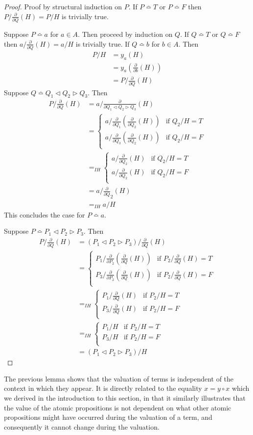 \documentclass[a4paper,twoside,openright]{report}
\newcommand{\dd}[1]{\frac{\partial}{\partial #1}}
\newcommand{\syn}{\bumpeq}
\newcommand{\lef}{\ensuremath{\triangleleft}}
\newcommand{\rig}{\ensuremath{\triangleright}}
\begin{document}
\begin{proof}
Proof by structural induction on $P$. If $P\syn T$ or $P\syn F$ then $P/\dd Q(H) = P/H$ is trivially true. 

Suppose $P\syn a$ for $a\in A$. Then proceed by induction on $Q$. If $Q\syn T$ or $Q\syn F$ then $a/\dd Q(H) = a/H$ is trivially true. If $Q\syn b$ for $b\in A$. Then
\begin{align*}
P/H &= y_a(H)\\
&= y_a(\dd b(H))\\
&= P/\dd Q(H)
\end{align*}
Suppose $Q\syn Q_1\lef Q_2\rig Q_3$. Then
\begin{align*}
P/\dd Q(H)
&=a/\dd{Q_1\lef Q_2\rig Q_3}(H)\\
&=\begin{cases}
a/\dd {Q_1}(\dd {Q_2}(H)) & \text{if $Q_2/H=T$}\\
a/\dd {Q_3}(\dd {Q_2}(H)) & \text{if $Q_2/H=F$}\\
\end{cases}\\
&=_{IH}\begin{cases}
a/\dd {Q_2}(H) & \text{if $Q_2/H=T$}\\
a/\dd {Q_2}(H) & \text{if $Q_2/H=F$}\\
\end{cases}\\
&=a/\dd Q_2(H)\\
&=_{IH}a/H
\end{align*}
This concludes the case for $P\syn a$.

Suppose $P\syn P_1\lef P_2\rig P_3$. Then
\begin{align*}
P/\dd Q(H)
&=(P_1\lef P_2\rig P_3)/\dd Q(H)\\
&=\begin{cases}
P_1/\dd {P_2}(\dd Q(H)) & \text{if $P_2/\dd Q(H)=T$}\\
P_3/\dd {P_2}(\dd Q(H)) & \text{if $P_2/\dd Q(H)=F$}\\
\end{cases}\\
&=_{IH}\begin{cases}
P_1/\dd Q(H) & \text{if $P_2/H=T$}\\
P_3/\dd Q(H) & \text{if $P_2/H=F$}\\
\end{cases}\\
&=_{IH}\begin{cases}
P_1/H & \text{if $P_2/H=T$}\\
P_3/H & \text{if $P_2/H=F$}\\
\end{cases}\\
&=(P_1\lef P_2\rig P_3)/H
\end{align*}
\end{proof}
The previous lemma shows that the valuation of terms is independent of the context in which they appear. It is directly related to the equality $x=y\circ x$ which we derived in the introduction to this section, in that it similarly illustrates that the value of the atomic propositions is not dependent on what other atomic propositions might have occurred during the valuation of a term, and consequently it cannot change during the valuation.
\end{document}
